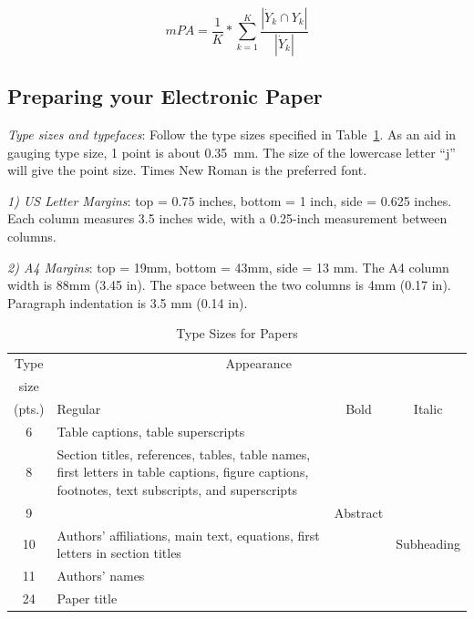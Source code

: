 \begin{equation}
mPA = \dfrac{1}{K}*\sum_{k=1}^{K}\dfrac{\left| \dot{Y}_k \cap Y_k \right|}{\left| \dot{Y}_k\right|}
\end{equation}

\subsection{Preparing your Electronic Paper}

{\em Type sizes and typefaces}: Follow the type sizes specified in
Table~\ref{table1}. As an aid in gauging type size, 1 point is
about 0.35~mm. The size of the lowercase letter ``j'' will give
the point size. Times New Roman is the preferred font.

{\em 1) US Letter Margins}:  top = 0.75 inches, bottom = 1 inch, side = 0.625 inches. 
Each column measures 3.5 inches wide, with a 0.25-inch measurement between columns.

{\em 2) A4 Margins}: top = 19mm, bottom = 43mm, side = 13 mm. The A4 column width is 
88mm (3.45 in). The space between the two columns is 4mm (0.17 in). Paragraph indentation 
is 3.5 mm (0.14 in).

\begin{table}[hb]
\begin{center} \caption{Type Sizes for Papers}
\label{table1}
\renewcommand{\arraystretch}{1.3}
\begin{tabular}{|c|p{34mm}|c|c|}
 \hline
Type & \multicolumn{3}{c|}{Appearance} \\
size &\multicolumn{3}{c|}{~} \\ \cline{2-4} (pts.) & Regular &
Bold & Italic \\ \hline
 6 & Table captions\footnotemark[1], table superscripts & & \\ \hline
 8 & Section titles\footnotemark[1], references, tables, table
 names\footnotemark[1],
 first letters in table captions\footnotemark[1], figure captions, footnotes,
 text subscripts, and superscripts &
& \\ \hline
 9 & & Abstract & \\ \hline
 10 & Authors' affiliations, main text, equations, first letters in
 section titles\footnotemark[1] & & Subheading \\ \hline
 11 & Authors' names & & \\ \hline
 24 & Paper title & & \\ \hline
\end{tabular}
\end{center}
\end{table}

